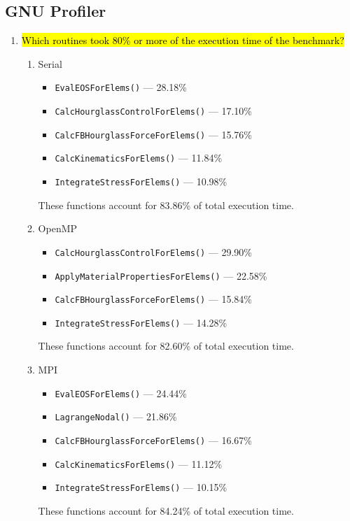 \documentclass{article}
\begin{document}
\subsection{GNU Profiler} %
\begin{enumerate}
	\item \hl{Which routines took 80\% or more of the execution time of the benchmark?}

	\begin{enumerate}
		\item Serial
		\begin{itemize}
			\item \verb!EvalEOSForElems()! --- 28.18\%
			\item \verb!CalcHourglassControlForElems()! --- 17.10\% 
			\item \verb!CalcFBHourglassForceForElems()! --- 15.76\%
			\item \verb!CalcKinematicsForElems()! --- 11.84\%
			\item \verb!IntegrateStressForElems()! --- 10.98\%
		\end{itemize}
		These functions account for 83.86\% of total execution time.

		\item OpenMP
		\begin{itemize}
			\item \verb!CalcHourglassControlForElems()! --- 29.90\%
			\item \verb!ApplyMaterialPropertiesForElems()! --- 22.58\%
			\item \verb!CalcFBHourglassForceForElems()! --- 15.84\%
			\item \verb!IntegrateStressForElems()! --- 14.28\%
		\end{itemize}
		These functions account for 82.60\% of total execution time.
		\vspace{1mm}

		\item MPI
		\begin{itemize}
			\item \verb!EvalEOSForElems()! --- 24.44\%
			\item \verb!LagrangeNodal()! --- 21.86\%
			\item \verb!CalcFBHourglassForceForElems()! --- 16.67\%
			\item \verb!CalcKinematicsForElems()! --- 11.12\%
			\item \verb!IntegrateStressForElems()! --- 10.15\%
		\end{itemize}
		These functions account for 84.24\% of total execution time.


\end{enumerate}
\end{enumerate}
\end{document}

